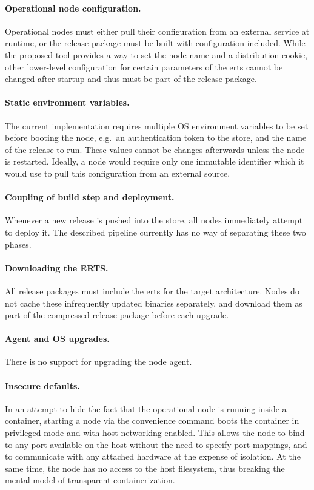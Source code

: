 \paragraph{Operational node configuration.} Operational nodes must either pull their configuration from an external service at runtime, or the release package must be built with configuration included. While the proposed tool provides a way to set the node name and a distribution cookie, other lower-level configuration for certain parameters of the \acrshort{erts} cannot be changed after startup and thus must be part of the release package.

\paragraph{Static environment variables.} The current implementation requires multiple OS environment variables to be set before booting the node, e.g.~an authentication token to the store, and the name of the release to run. These values cannot be changes afterwards unless the node is restarted. Ideally, a node would require only one immutable identifier which it would use to pull this configuration from an external source.

\paragraph{Coupling of build step and deployment.} Whenever a new release is pushed into the store, all nodes immediately attempt to deploy it. The described pipeline currently has no way of separating these two phases.

\paragraph{Downloading the ERTS.} All release packages must include the \acrlong{erts} for the target architecture. Nodes do not cache these infrequently updated binaries separately, and download them as part of the compressed release package before each upgrade.

\paragraph{Agent and OS upgrades.} There is no support for upgrading the node agent.

\paragraph{Insecure defaults.} In an attempt to hide the fact that the operational node is running inside a container, starting a node via the convenience command boots the container in privileged mode and with host networking enabled. This allows the node to bind to any port available on the host without the need to specify port mappings, and to communicate with any attached hardware at the expense of isolation. At the same time, the node has no access to the host filesystem, thus breaking the mental model of transparent containerization.

